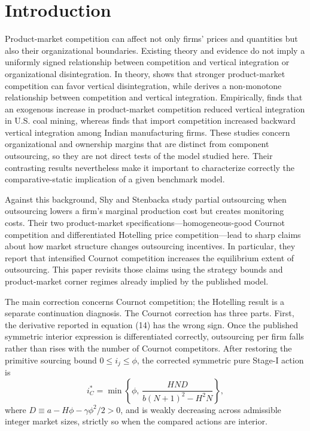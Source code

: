 \section{Introduction}
\label{sec:introduction}

Product-market competition can affect not only firms' prices and quantities but also their organizational boundaries.  Existing theory and evidence do not imply a uniformly signed relationship between competition and vertical integration or organizational disintegration.  In theory, \cite{DeBettignies2006} shows that stronger product-market competition can favor vertical disintegration, while \cite{AghionGriffithHowitt2006} derives a non-monotone relationship between competition and vertical integration.  Empirically, \cite{McGowan2017} finds that an exogenous increase in product-market competition reduced vertical integration in U.S. coal mining, whereas \cite{StiebaleVencappa2022} finds that import competition increased backward vertical integration among Indian manufacturing firms.  These studies concern organizational and ownership margins that are distinct from component outsourcing, so they are not direct tests of the model studied here.  Their contrasting results nevertheless make it important to characterize correctly the comparative-static implication of a given benchmark model.

Against this background, Shy and Stenbacka \cite{ShyStenbacka2005} study partial outsourcing when outsourcing lowers a firm's marginal production cost but creates monitoring costs.  Their two product-market specifications---homogeneous-good Cournot competition and differentiated Hotelling price competition---lead to sharp claims about how market structure changes outsourcing incentives.  In particular, they report that intensified Cournot competition increases the equilibrium extent of outsourcing.  This paper revisits those claims using the strategy bounds and product-market corner regimes already implied by the published model.

The main correction concerns Cournot competition; the Hotelling result is a separate continuation diagnosis.  The Cournot correction has three parts.  First, the derivative reported in equation (14) has the wrong sign.  Once the published symmetric interior expression is differentiated correctly, outsourcing per firm falls rather than rises with the number of Cournot competitors.  After restoring the primitive sourcing bound \(0\le i_j\le\phi\), the corrected symmetric pure Stage-I action is
\[
i_C^*
=
\min\left\{
\phi,\,
\frac{HND}{b(N+1)^2-H^2N}
\right\},
\]
where \(D\equiv a-H\phi-\gamma\phi^2/2>0\), and is weakly decreasing across admissible integer market sizes, strictly so when the compared actions are interior.

